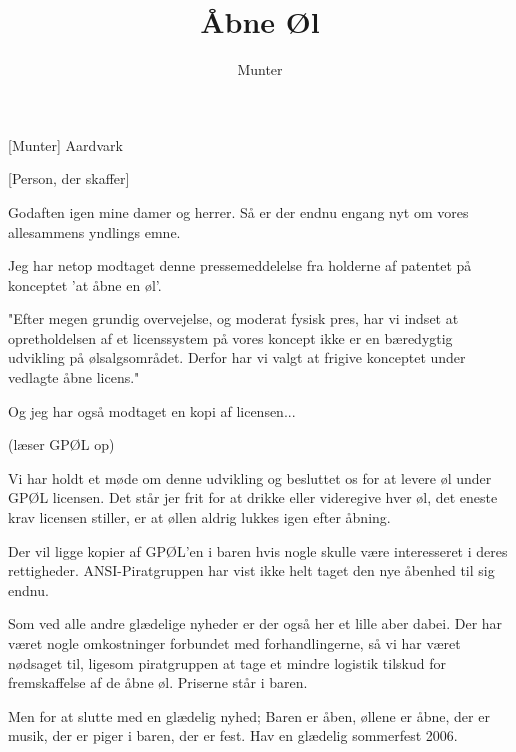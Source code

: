 \documentclass[a4paper,11pt]{article}
\title{Åbne Øl}
\author{Munter}
\begin{document}
\maketitle

\begin{roles}
[Munter] Aardvark
\end{roles}

\begin{props}
[Person, der skaffer]
\end{props}

  
\begin{sketch}


 Godaften igen mine damer og herrer. Så er der endnu engang nyt 
         om vores allesammens yndlings emne.
         
 Jeg har netop modtaget denne pressemeddelelse fra holderne af 
         patentet på konceptet 'at åbne en øl'. 
         
 "Efter megen grundig overvejelse, og moderat fysisk pres, har 
         vi indset at opretholdelsen af et licenssystem på vores koncept 
         ikke er en bæredygtig udvikling på ølsalgsområdet.
         Derfor har vi valgt at frigive konceptet under vedlagte åbne
         licens."

 Og jeg har også modtaget en kopi af licensen... 

 (læser GPØL op)

 Vi har holdt et møde om denne udvikling og besluttet os for at 
         levere øl under GPØL licensen. Det står jer frit for at
         drikke eller videregive hver øl, det eneste krav licensen
         stiller, er at øllen aldrig lukkes igen efter åbning.

 Der vil ligge kopier af GPØL'en i baren hvis nogle skulle være
         interesseret i deres rettigheder. ANSI-Piratgruppen har vist 
         ikke helt taget den nye åbenhed til sig endnu.

 Som ved alle andre glædelige nyheder er der også her et lille 
         aber dabei. Der har været nogle omkostninger forbundet med 
         forhandlingerne, så vi har været nødsaget til, ligesom
         piratgruppen at tage et mindre logistik tilskud for
         fremskaffelse af de åbne øl. Priserne står i baren.
         
 Men for at slutte med en glædelig nyhed; Baren er åben, øllene 
         er åbne, der er musik, der er piger i baren, der er fest.
         Hav en glædelig sommerfest 2006.
         


\end{sketch}
\end{document}
